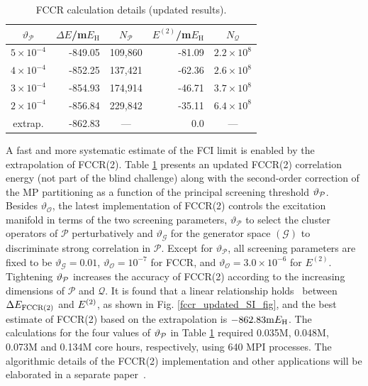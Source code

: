 \documentclass[journal=jcp,manuscript=suppinfo]{achemso}
\begin{document}
%
\begin{table}[ht!]
\begin{center}
\caption{FCCR calculation details (updated results).}
\label{fccr_update_SI_table}
\begin{tabular}{r|r|r|r|r}
\toprule
\multicolumn{1}{c|}{$\vartheta_{\mathcal{P}}$} & \multicolumn{1}{c|}{$\Delta E$/m$E_{\text{H}}$} & \multicolumn{1}{c|}{$N_{\mathcal{P}}$} & \multicolumn{1}{c|}{$E^{(2)}$/m$E_{\text{H}}$} & \multicolumn{1}{c}{$N_{\mathcal{Q}}$} \\
\midrule\midrule
$5\times10^{-4}$   &  -849.05 & 109,860 & -81.09 & $2.2\times10^{8}$ \\
$4\times10^{-4}$   &  -852.25 & 137,421 & -62.36 & $2.6\times10^{8}$ \\
$3\times10^{-4}$   &  -854.93 & 174,914 & -46.71 & $3.7\times10^{8}$ \\
$2\times10^{-4}$   &  -856.84 & 229,842 & -35.11 & $6.4\times10^{8}$ \\
\hline
\multicolumn{1}{c|}{extrap.} &  -862.83 & \multicolumn{1}{c|}{---} & 0.0 & \multicolumn{1}{c|}{---} \\
\midrule
\end{tabular}
\vspace{-0.6cm}
\end{center}
\end{table}
%
A fast and more systematic estimate of the FCI limit is enabled by the extrapolation of FCCR(2). Table \ref{fccr_update_SI_table} presents an updated FCCR(2) correlation energy (not part of the blind challenge) along with the second-order correction of the MP partitioning as a function of the principal screening threshold $\vartheta\rm_{\mathcal P}$. Besides $\vartheta_{\mathcal O}$, the latest implementation of FCCR(2) controls the excitation manifold in terms of the two screening parameters, $\vartheta_{\mathcal P}$ to select the cluster operators of ${\mathcal P}$ perturbatively and $\vartheta_{\mathcal G}$ for the generator space $({\mathcal G})$ to discriminate strong correlation in ${\mathcal P}$.\cite{ten_no_fccr_2020} Except for $\vartheta_{\mathcal P}$, all screening parameters are fixed to be $\vartheta_{\mathcal G}=0.01$, $\vartheta_{\mathcal O}=10^{-7}$ for FCCR, and $\vartheta_{\mathcal O}=3.0\times10^{-6}$ for $E^{(2)}$. Tightening $\vartheta\rm_{\mathcal P}$ increases the accuracy of FCCR(2) according to the increasing dimensions of ${\mathcal P}$ and ${\mathcal Q}$. It is found that a linear relationship holds~\cite{ten_no_fccr_2020} between $\Delta E_{\rm FCCR(2)}$ and $E^{\rm (2)}$, as shown in Fig. \ref{fccr_updated_SI_fig}, and the best estimate of FCCR(2) based on the extrapolation is $-862.83{\rm m}E_{\rm H}$. The calculations for the four values of $\vartheta\rm_{\mathcal P}$ in Table \ref{fccr_update_SI_table} required 0.035M, 0.048M, 0.073M and 0.134M core hours, respectively, using 640 MPI processes. The algorithmic details of the FCCR(2) implementation and other applications will be elaborated in a separate paper~\cite{ten_no_fccr_2020}.
\end{document}
